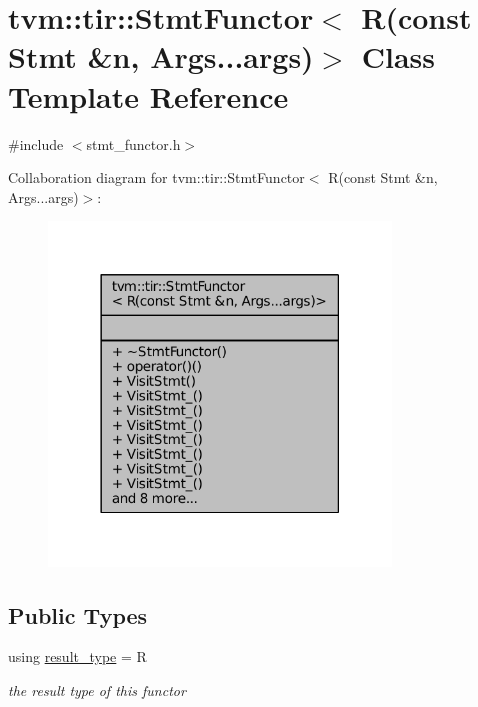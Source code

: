 \hypertarget{classtvm_1_1tir_1_1StmtFunctor_3_01R_07const_01Stmt_01_6n_00_01Args_8_8_8args_08_4}{}\section{tvm\+:\+:tir\+:\+:Stmt\+Functor$<$ R(const Stmt \&n, Args...args)$>$ Class Template Reference}
\label{classtvm_1_1tir_1_1StmtFunctor_3_01R_07const_01Stmt_01_6n_00_01Args_8_8_8args_08_4}


{\ttfamily \#include $<$stmt\+\_\+functor.\+h$>$}



Collaboration diagram for tvm\+:\+:tir\+:\+:Stmt\+Functor$<$ R(const Stmt \&n, Args...args)$>$\+:
\nopagebreak
\begin{figure}[H]
\begin{center}
\leavevmode
\includegraphics[width=258pt]{classtvm_1_1tir_1_1StmtFunctor_3_01R_07const_01Stmt_01_6n_00_01Args_8_8_8args_08_4__coll__graph}
\end{center}
\end{figure}
\subsection*{Public Types}
\begin{DoxyCompactItemize}
\item 
using \hyperlink{classtvm_1_1tir_1_1StmtFunctor_3_01R_07const_01Stmt_01_6n_00_01Args_8_8_8args_08_4_ab5c892a2e36985e58d69f7b2ca2e0260}{result\+\_\+type} = R
\begin{DoxyCompactList}\small\item\em the result type of this functor \end{DoxyCompactList}\end{DoxyCompactItemize}
